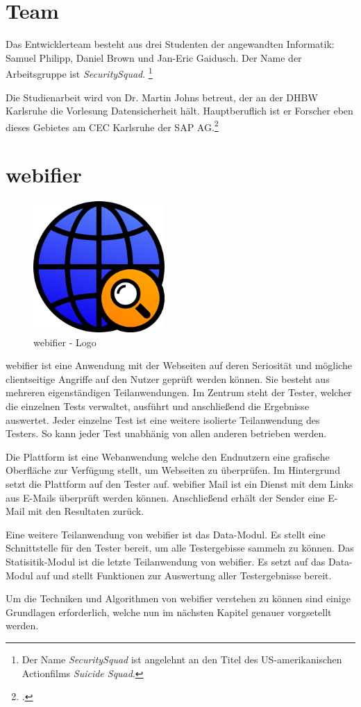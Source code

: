 \section{Team}
Das Entwicklerteam besteht aus drei Studenten der angewandten Informatik:
Samuel Philipp, Daniel Brown und Jan-Eric Gaidusch.
Der Name der Arbeitsgruppe ist \textit{SecuritySquad}.
\footnote{Der Name \textit{SecuritySquad} ist angelehnt an den Titel des US-amerikanischen Actionfilms \textit{Suicide Squad}.}

Die Studienarbeit wird von Dr. Martin Johns betreut, der an der DHBW Karlsruhe die Vorlesung Datensicherheit hält. Hauptberuflich ist er Forscher eben dieses Gebietes am CEC Karlsruhe der SAP AG.\footcite[Vgl.]{johnsProfile}

\section{webifier}

\begin{figure}[H]
  \centering
  \includegraphics[width=5cm]{images/webifier}
  \caption{webifier - Logo}
  \label{fig:webifier-logo}
\end{figure}

webifier ist eine Anwendung mit der Webseiten auf deren Seriosität und mögliche clientseitige Angriffe auf den Nutzer geprüft werden können. Sie besteht aus mehreren eigenständigen Teilanwendungen. Im Zentrum steht der Tester, welcher die einzelnen Tests verwaltet, ausführt und anschließend die Ergebnisse auswertet. Jeder einzelne Test ist eine weitere isolierte Teilanwendung des Testers. So kann jeder Test unabhänig von allen anderen betrieben werden.

Die Plattform ist eine Webanwendung welche den Endnutzern eine grafische Oberfläche zur Verfügung stellt, um Webseiten zu überprüfen. Im Hintergrund setzt die Plattform auf den Tester auf. webifier Mail ist ein Dienst mit dem Links aus E-Mails überprüft werden können. Anschließend erhält der Sender eine E-Mail mit den Resultaten zurück.

Eine weitere Teilanwendung von webifier ist das Data-Modul. Es stellt eine Schnittstelle für den Tester bereit, um alle Testergebisse sammeln zu können. Das Statisitik-Modul ist die letzte Teilanwendung von webifier. Es setzt auf das Data-Modul auf und stellt Funktionen zur Auswertung aller Testergebnisse bereit.

Um die Techniken und Algorithmen von webifier verstehen zu können sind einige Grundlagen erforderlich, welche nun im nächsten Kapitel genauer vorgsetellt werden.
